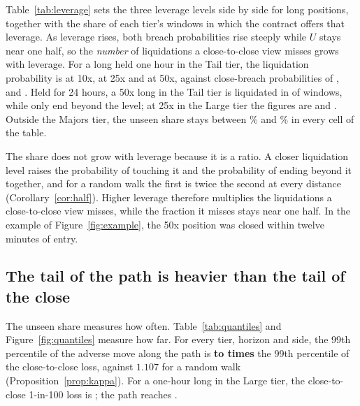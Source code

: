Table~\ref{tab:leverage} sets the three leverage levels side by side for long positions, together
with the share of each tier's windows in which the contract offers that leverage. As leverage rises,
both breach probabilities rise steeply while $U$ stays near one half, so the \emph{number} of
liquidations a close-to-close view misses grows with leverage. For a long held one hour in the Tail
tier, the liquidation probability is \TailHourPPTen{} at 10x, \TailHourPPTwentyFive{} at 25x and
\TailHourPPFifty{} at 50x, against close-breach probabilities of \TailHourPCTen, \TailHourPCTwentyFive{}
and \TailHourPCFifty. Held for 24 hours, a 50x long in the Tail tier is liquidated in \TailDayPPFifty{}
of windows, while only \TailDayPCFifty{} end beyond the level; at 25x in the Large tier the figures
are \LargeDayPPTwentyFive{} and \LargeDayPCTwentyFive. Outside the Majors tier, the unseen share stays
between \LevULo\% and \LevUHi\% in every cell of the table.

The share does not grow with leverage because it is a ratio. A closer liquidation level raises the
probability of touching it and the probability of ending beyond it together, and for a random walk
the first is twice the second at every distance\iftechnical{} (Corollary~\ref{cor:half})\fi. Higher
leverage therefore multiplies the liquidations a close-to-close view misses, while the fraction it
misses stays near one half. In the example of
Figure~\ref{fig:example}, the 50x position was closed within twelve minutes of entry.

\begin{table}[t]
\centering
\caption{Long positions at 10x, 25x and 50x, mark price, each contract with its own
maintenance-margin rate. \emph{Offered}: share of the tier's windows in which the contract offers that
leverage. $p_C$, $p_P$: close and path breach probabilities; $U$: unseen share.}
\label{tab:leverage}
\footnotesize

\end{table}

\subsection{The tail of the path is heavier than the tail of the close}

The unseen share measures how often. Table~\ref{tab:quantiles} and Figure~\ref{fig:quantiles}
measure how far. For every tier, horizon and side, the 99th percentile of the adverse move along the
path is \textbf{\KappaLo{} to \KappaHi{} times} the 99th percentile of the close-to-close loss,
against $1.107$ for a random walk\iftechnical{} (Proposition~\ref{prop:kappa})\fi. For a one-hour
long in the Large tier, the close-to-close 1-in-100 loss is \LargeHourQC; the path reaches
\LargeHourQP.

